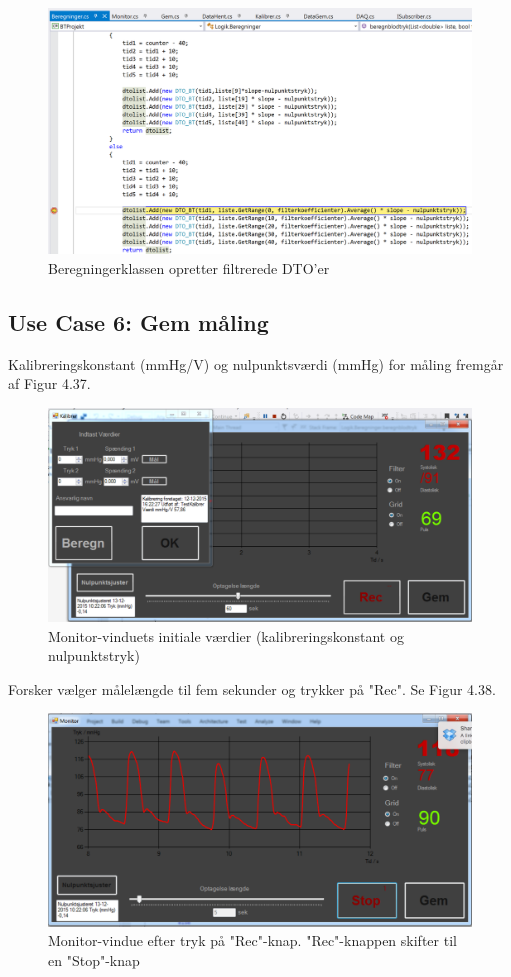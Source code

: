 \begin{figure}[H]
	\centering
	\includegraphics[width=1\textwidth]{Figurer/Test_Aktiver_4}
	\caption{Beregningerklassen opretter filtrerede DTO'er}
\end{figure}

\subsection{Use Case 6: Gem måling}
Kalibreringskonstant (mmHg/V) og nulpunktsværdi (mmHg) for måling fremgår af Figur 4.37.
\begin{figure}[H]
	\centering
	\includegraphics[width=1\textwidth]{Figurer/UC6_InitialConditions}
	\caption{Monitor-vinduets initiale værdier (kalibreringskonstant og nulpunktstryk)}
\end{figure}
 
Forsker vælger målelængde til fem sekunder og trykker på "Rec". Se Figur 4.38.
 
\begin{figure}[H]
	\centering
	\includegraphics[width=1\textwidth]{Figurer/UC6_ForceRecEnd}
	\caption{Monitor-vindue efter tryk på "Rec"\--knap. "Rec"\--knappen skifter til en "Stop"\--knap}
\end{figure}

